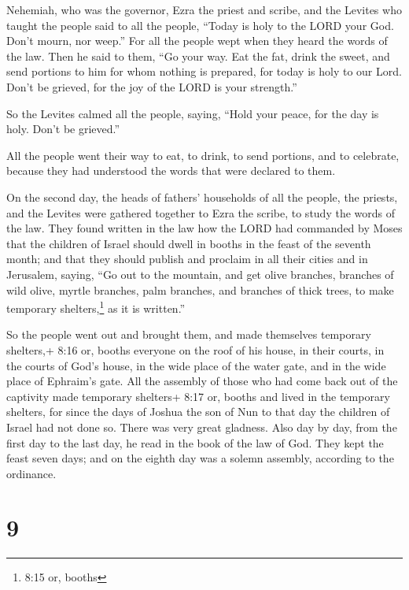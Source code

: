  Nehemiah, who was the governor, Ezra the priest and scribe,
and the Levites who taught the people said to all the people, ``Today is
holy to the LORD your God. Don't mourn, nor weep.'' For all the people
wept when they heard the words of the law.  Then he said to
them, ``Go your way. Eat the fat, drink the sweet, and send portions to
him for whom nothing is prepared, for today is holy to our Lord. Don't
be grieved, for the joy of the LORD is your strength.''

 So the Levites calmed all the people, saying, ``Hold your
peace, for the day is holy. Don't be grieved.''

 All the people went their way to eat, to drink, to send
portions, and to celebrate, because they had understood the words that
were declared to them.

 On the second day, the heads of fathers' households of all
the people, the priests, and the Levites were gathered together to Ezra
the scribe, to study the words of the law.  They found
written in the law how the LORD had commanded by Moses that the children
of Israel should dwell in booths in the feast of the seventh month;
 and that they should publish and proclaim in all their
cities and in Jerusalem, saying, ``Go out to the mountain, and get olive
branches, branches of wild olive, myrtle branches, palm branches, and
branches of thick trees, to make temporary shelters,\footnote{8:15 or,
  booths} as it is written.''

 So the people went out and brought them, and made
themselves temporary shelters,+ 8:16 or, booths everyone on the roof of
his house, in their courts, in the courts of God's house, in the wide
place of the water gate, and in the wide place of Ephraim's gate.
 All the assembly of those who had come back out of the
captivity made temporary shelters+ 8:17 or, booths and lived in the
temporary shelters, for since the days of Joshua the son of Nun to that
day the children of Israel had not done so. There was very great
gladness.  Also day by day, from the first day to the last
day, he read in the book of the law of God. They kept the feast seven
days; and on the eighth day was a solemn assembly, according to the
ordinance.

\hypertarget{section-8}{%
\section{9}\label{section-8}}

